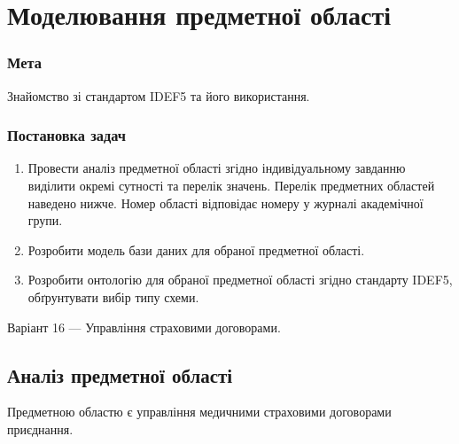 



\newcommand{\labnumber}{1} %



\graphicspath{{figures/}}


\Ukrainian


\addtocounter{page}{1}

\section*{Моделювання предметної області}
\subsubsection*{Мета}
Знайомство зі стандартом IDEF5 та його використання.
\subsubsection*{Постановка задач}
\begin{enumerate}
  \item Провести аналіз предметної області згідно індивідуальному завданню виділити окремі сутності та перелік значень. 
  Перелік предметних областей наведено нижче. 
  Номер області відповідає номеру у журналі академічної групи.
  \item Розробити модель бази даних для обраної предметної області.
  \item Розробити онтологію для обраної предметної області згідно стандарту IDEF5, обґрунтувати вибір типу схеми.
\end{enumerate}

\begin{center}
Варіант 16 --- Управління страховими договорами.
\end{center}

\subsection*{Аналіз предметної області}
Предметною областю є управління медичними страховими договорами приєднання.

